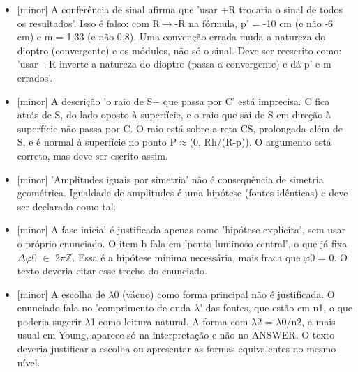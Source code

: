 \documentclass{article}%
\begin{document}
\begin{itemize}%
\item%
{[}minor{]} A conferência de sinal afirma que 'usar +R trocaria o sinal de todos os resultados'. Isso é falso: com R$\to$-R na fórmula, p' = -10 cm (e não -6 cm) e m = 1,33 (e não 0,8). Uma convenção errada muda a natureza do dioptro (convergente) e os módulos, não só o sinal. Deve ser reescrito como: 'usar +R inverte a natureza do dioptro (passa a convergente) e dá p' e m errados'.%
\item%
{[}minor{]} A descrição 'o raio de S+ que passa por C' está imprecisa. C fica atrás de S, do lado oposto à superfície, e o raio que sai de S em direção à superfície não passa por C. O raio está sobre a reta CS, prolongada além de S, e é normal à superfície no ponto P$\approx$(0, Rh/(R-p)). O argumento está correto, mas deve ser escrito assim.%
\item%
{[}minor{]} 'Amplitudes iguais por simetria' não é consequência de simetria geométrica. Igualdade de amplitudes é uma hipótese (fontes idênticas) e deve ser declarada como tal.%
\item%
{[}minor{]} A fase inicial é justificada apenas como 'hipótese explícita', sem usar o próprio enunciado. O item b fala em 'ponto luminoso central', o que já fixa $\Delta$$\varphi$0 $\in$ 2$\pi$$\mathbb{Z}$. Essa é a hipótese mínima necessária, mais fraca que $\varphi$0 = 0. O texto deveria citar esse trecho do enunciado.%
\item%
{[}minor{]} A escolha de $\lambda$0 (vácuo) como forma principal não é justificada. O enunciado fala no 'comprimento de onda $\lambda$' das fontes, que estão em n1, o que poderia sugerir $\lambda$1 como leitura natural. A forma com $\lambda$2 = $\lambda$0/n2, a mais usual em Young, aparece só na interpretação e não no ANSWER. O texto deveria justificar a escolha ou apresentar as formas equivalentes no mesmo nível.%
\end{itemize}%
\end{document}
